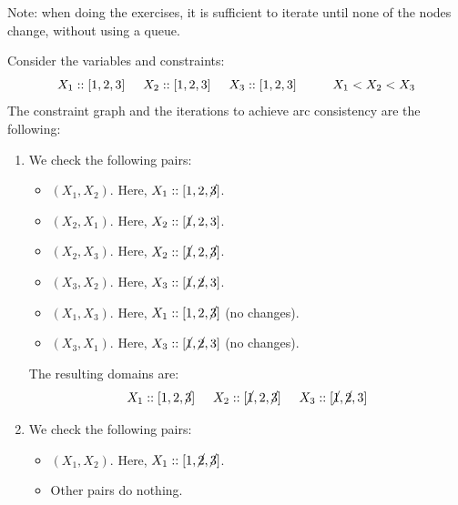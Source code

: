 \begin{description}
        \begin{example}
            Note: when doing the exercises, it is sufficient to iterate until none of the nodes change, without using a queue.
            
            Consider the variables and constraints: 
            \[ X_1 :: [1, 2, 3] \hspace{0.5cm} X_2 :: [1, 2, 3] \hspace{0.5cm} X_3 :: [1, 2, 3]  \hspace{1cm}  X_1 < X_2 < X_3 \]
            The constraint graph and the iterations to achieve arc consistency are the following:

            \begin{minipage}{0.7\textwidth}
                \begin{enumerate}
                    \item We check the following pairs:
                        \begin{itemize}
                            \item $(X_1, X_2)$. Here, $X_1 :: [1, 2, \cancel{3}]$.
                            \item $(X_2, X_1)$. Here, $X_2 :: [\cancel{1}, 2, 3]$.
                            \item $(X_2, X_3)$. Here, $X_2 :: [\cancel{1}, 2, \cancel{3}]$.
                            \item $(X_3, X_2)$. Here, $X_3 :: [\cancel{1}, \cancel{2}, 3]$.
                            \item $(X_1, X_3)$. Here, $X_1 :: [1, 2, \cancel{3}]$ (no changes).
                            \item $(X_3, X_1)$. Here, $X_3 :: [\cancel{1}, \cancel{2}, 3]$ (no changes).
                        \end{itemize}
                        The resulting domains are:
                        \[ X_1 :: [1, 2, \cancel{3}] \hspace{0.5cm} X_2 :: [\cancel{1}, 2, \cancel{3}] \hspace{0.5cm} X_3 :: [\cancel{1}, \cancel{2}, 3] \]
                    \item We check the following pairs:
                        \begin{itemize}
                            \item $(X_1, X_2)$. Here, $X_1 :: [1, \cancel{2}, \cancel{3}]$.
                            \item Other pairs do nothing.
                        \end{itemize}

\end{enumerate}
\end{minipage}
\end{example}
\end{description}
